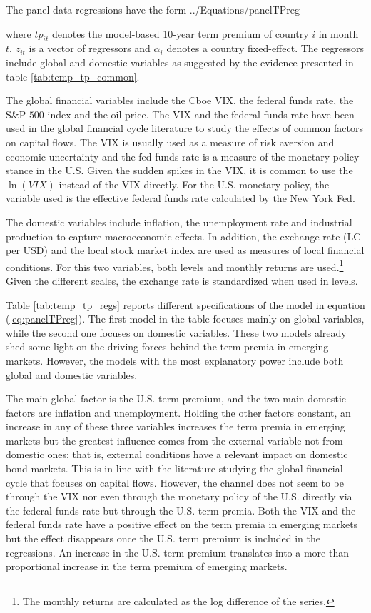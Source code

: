 The panel data regressions have the form
	 {../Equations/panelTPreg}

where $tp_{it}$ denotes the model-based 10-year term premium of country $i$ in month $t$, $z_{it}$ is a vector of regressors and $\alpha_{i}$ denotes a country fixed-effect. The regressors include global and domestic variables as suggested by the evidence presented in table \ref{tab:temp_tp_common}.

The global financial variables include the Cboe VIX, the federal funds rate, the S\&P $500$ index and the oil price. The VIX and the federal funds rate have been used in the global financial cycle literature \citep[see][]{Rey:2013} to study the effects of common factors on capital flows. The VIX is usually used as a measure of risk aversion and economic uncertainty and the fed funds rate is a measure of the monetary policy stance in the U.S. Given the sudden spikes in the VIX, it is common to use the $\ln \left( VIX \right)$ instead of the VIX directly. For the U.S. monetary policy, the variable used is the effective federal funds rate calculated by the New York Fed. 
 
 The domestic variables include inflation, the unemployment rate and industrial production to capture macroeconomic effects. In addition, the exchange rate (LC per USD) and the local stock market index are used as measures of local financial conditions. For this two variables, both levels and monthly returns are used.\footnote{The monthly returns are calculated as the log difference of the series.} Given the different scales, the exchange rate is standardized when used in levels.

Table \ref{tab:temp_tp_regs} reports different specifications of the model in equation (\ref{eq:panelTPreg}). The first model in the table focuses mainly on global variables, while the second one focuses on domestic variables. These two models already shed some light on the driving forces behind the term premia in emerging markets. However, the models with the most explanatory power include both global and domestic variables.
%	
	

The main global factor is the U.S. term premium, and the two main domestic factors are inflation and unemployment. Holding the other factors constant, an increase in any of these three variables increases the term premia in emerging markets but the greatest influence comes from the external variable not from domestic ones; that is, external conditions have a relevant impact on domestic bond markets. This is in line with the literature studying the global financial cycle that focuses on capital flows. However, the channel does not seem to be through the VIX nor even through the monetary policy of the U.S. directly via the federal funds rate but through the U.S. term premia. Both the VIX and the federal funds rate have a positive effect on the term premia in emerging markets but the effect disappears once the U.S. term premium is included in the regressions. An increase in the U.S. term premium translates into a more than proportional increase in the term premium of emerging markets.


